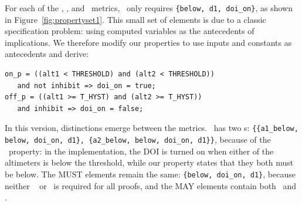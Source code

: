 \noindent %
For each of the \ivccov, \maycov, and \mustcov\ metrics, {\small \allp} ~only requires {\small \texttt{\{below, d1, doi\_on\}}}, as shown in Figure~\ref{fig:propertyset1}.
This small set of elements is due to a classic specification problem: using computed variables as the antecedents of implications.  %
%
%
We therefore modify our properties to use inputs and constants as antecedents and derive:

{\smaller
\begin{verbatim}
on_p = ((alt1 < THRESHOLD) and (alt2 < THRESHOLD))
   and not inhibit => doi_on = true;
off_p = ((alt1 >= T_HYST) and (alt2 >= T_HYST))
   and inhibit => doi_on = false;
\end{verbatim}
}

\noindent In this version, distinctions emerge between the metrics.  {\small \allp } ~has two \mivc s: {\small{ \texttt{\{\{a1\_below, below, doi\_on, d1\}, \{a2\_below, below, doi\_on, d1\}\}}}},
because of the {\small { \onp }} ~property: in the implementation, the DOI is turned on when either of the altimeters is below the threshold, while our property states that they both must be below.
The MUST elements remain the same: {\small{ \texttt{\{below, doi\_on, d1\}}}}, because neither {\small \aonebelow }~ or {\small {\atwobelow}} ~is required for all proofs, and   %
the MAY elements contain both {\small \aonebelow } ~and {\small \atwobelow }.

